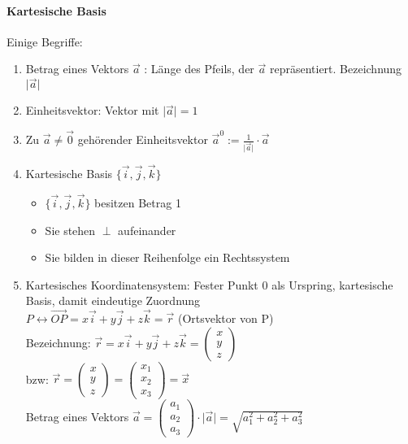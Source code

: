 \documentclass[a4paper]{scrartcl}
\begin{document}
\paragraph{Kartesische Basis}
Einige Begriffe:
\begin{enumerate}
\item Betrag eines Vektors $\vec{a}$ : Länge des Pfeils, der $\vec{a}$ repräsentiert. Bezeichnung $\lvert \vec{a} \rvert$
\item Einheitsvektor: Vektor mit $\lvert \vec{a} \rvert = 1$
\item Zu $\vec{a} \neq \vec{0}$ gehörender Einheitsvektor $\vec{a}^0 :=  \frac{1}{\lvert \vec{a} \rvert} \cdot \vec{a}$
\item Kartesische Basis $\{\vec{i},\vec{j},\vec{k}\}$
\begin{itemize}
\item $\{\vec{i},\vec{j},\vec{k}\}$ besitzen Betrag 1
\item Sie stehen $\perp$ aufeinander
\item Sie bilden in dieser Reihenfolge ein Rechtssystem
\end{itemize}
\item Kartesisches Koordinatensystem: Fester Punkt $0$ als Urspring, kartesische Basis, damit eindeutige Zuordnung\\
$P \leftrightarrow \overrightarrow{OP} = x\vec{i} + y \vec{j} + z \vec{k} = \vec{r}$ (Ortsvektor von P)\\
Bezeichnung: $\vec{r} = x \vec{i} + y \vec{j} + z \vec{k} = \begin{pmatrix} x \\ y \\ z \end{pmatrix}$\\
bzw: $\vec{r} = \begin{pmatrix} x \\ y \\ z \end{pmatrix} = \begin{pmatrix} x_1 \\ x_2 \\ x_3 \end{pmatrix} = \vec{x}$\\
Betrag eines Vektors $\vec{a}= \begin{pmatrix} a_1 \\ a_2 \\ a_3 \end{pmatrix} \cdot \lvert \vec{a} \rvert = \sqrt{a_1^2 + a_2^2 + a_3^2}$
\end{enumerate}
\end{document}

